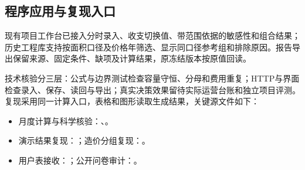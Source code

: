 \subsection{程序应用与复现入口}

现有项目工作台已接入分时录入、收支切换值、带范围依据的敏感性和组合结果；历史工程库支持按面积口径及价格年筛选、显示同口径参考组和排除原因。报告导出保留来源、固定条件、缺项及计算结果，原冻结版本按原值回读。

技术核验分三层：公式与边界测试检查容量守恒、分母和费用重复；HTTP与界面检查录入、保存、读回与导出；真实决策效果留待实际运营台账和独立项目评测。复现采用同一计算入口，表格和图形读取生成结果，关键源文件如下：
\begin{itemize}
\item 月度计算与科学核验：、。
\item 演示结果复现：；造价分组复现：。
\item 用户表接收：；公开问卷审计：。
\end{itemize}
